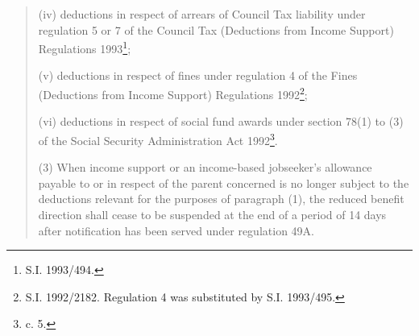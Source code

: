 \documentclass[a4paper,12pt]{article}
\begin{document}
{\begin{quotation}
\begin{enumerate}
(iv) deductions in respect of arrears of Council Tax liability under regulation 5 or 7 of the Council Tax (Deductions from Income Support) Regulations 1993\footnote{\frenchspacing S.I. 1993/494.};

(v) deductions in respect of fines under regulation 4 of the Fines (Deductions from Income Support) Regulations 1992\footnote{\frenchspacing S.I. 1992/2182. Regulation 4 was substituted by S.I. 1993/495.};

(vi) deductions in respect of social fund awards under section 78(1) to (3) of the Social Security Administration Act 1992\footnote{ c. 5.}.
\end{enumerate}

(3) When income support 
or an income-based jobseeker’s allowance  %
payable to or in respect of the parent concerned is no longer subject to the deductions relevant for the purposes of paragraph (1), the reduced benefit direction shall cease to be suspended at the end of a period of 14 days after notification has been served under regulation 49A.
\end{quotation}
}
\end{document}
